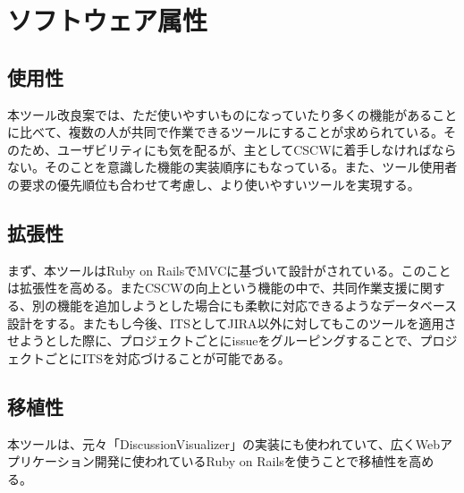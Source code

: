 \documentclass[12pt, oneside]{jreport}
\begin{document}
	\section{ソフトウェア属性}
	
		\subsection{使用性}
		本ツール改良案では、ただ使いやすいものになっていたり多くの機能があることに比べて、複数の人が共同で作業できるツールにすることが求められている。そのため、ユーザビリティにも気を配るが、主としてCSCWに着手しなければならない。そのことを意識した機能の実装順序にもなっている。また、ツール使用者の要求の優先順位も合わせて考慮し、より使いやすいツールを実現する。
		
		\subsection{拡張性}
		まず、本ツールはRuby on RailsでMVCに基づいて設計がされている。このことは拡張性を高める。またCSCWの向上という機能の中で、共同作業支援に関する、別の機能を追加しようとした場合にも柔軟に対応できるようなデータベース設計をする。またもし今後、ITSとしてJIRA以外に対してもこのツールを適用させようとした際に、プロジェクトごとにissueをグルーピングすることで、プロジェクトごとにITSを対応づけることが可能である。
		
		\subsection{移植性}
		本ツールは、元々「DiscussionVisualizer」の実装にも使われていて、広くWebアプリケーション開発に使われているRuby on Railsを使うことで移植性を高める。
\end{document}
